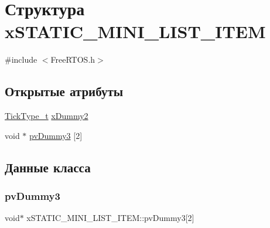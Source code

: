 \hypertarget{structx_s_t_a_t_i_c___m_i_n_i___l_i_s_t___i_t_e_m}{}\section{Структура x\+S\+T\+A\+T\+I\+C\+\_\+\+M\+I\+N\+I\+\_\+\+L\+I\+S\+T\+\_\+\+I\+T\+EM}
\label{structx_s_t_a_t_i_c___m_i_n_i___l_i_s_t___i_t_e_m}


{\ttfamily \#include $<$Free\+R\+T\+O\+S.\+h$>$}

\subsection*{Открытые атрибуты}
\begin{DoxyCompactItemize}
\item 
\mbox{\hyperlink{portmacro_8h_aa69c48c6e902ce54f70886e6573c92a9}{Tick\+Type\+\_\+t}} \mbox{\hyperlink{structx_s_t_a_t_i_c___m_i_n_i___l_i_s_t___i_t_e_m_a0cbe65e7e550dc4bca38579ccac6c512}{x\+Dummy2}}
\item 
void $\ast$ \mbox{\hyperlink{structx_s_t_a_t_i_c___m_i_n_i___l_i_s_t___i_t_e_m_a212bc2495f1e3a225f50d3311ce00cb9}{pv\+Dummy3}} \mbox{[}2\mbox{]}
\end{DoxyCompactItemize}


\subsection{Данные класса}
\mbox{\label{structx_s_t_a_t_i_c___m_i_n_i___l_i_s_t___i_t_e_m_a212bc2495f1e3a225f50d3311ce00cb9}} 
\subsubsection{\texorpdfstring{pvDummy3}{pvDummy3}}
{\footnotesize\ttfamily void$\ast$ x\+S\+T\+A\+T\+I\+C\+\_\+\+M\+I\+N\+I\+\_\+\+L\+I\+S\+T\+\_\+\+I\+T\+E\+M\+::pv\+Dummy3\mbox{[}2\mbox{]}}

\mbox{\label{structx_s_t_a_t_i_c___m_i_n_i___l_i_s_t___i_t_e_m_a0cbe65e7e550dc4bca38579ccac6c512}} 

